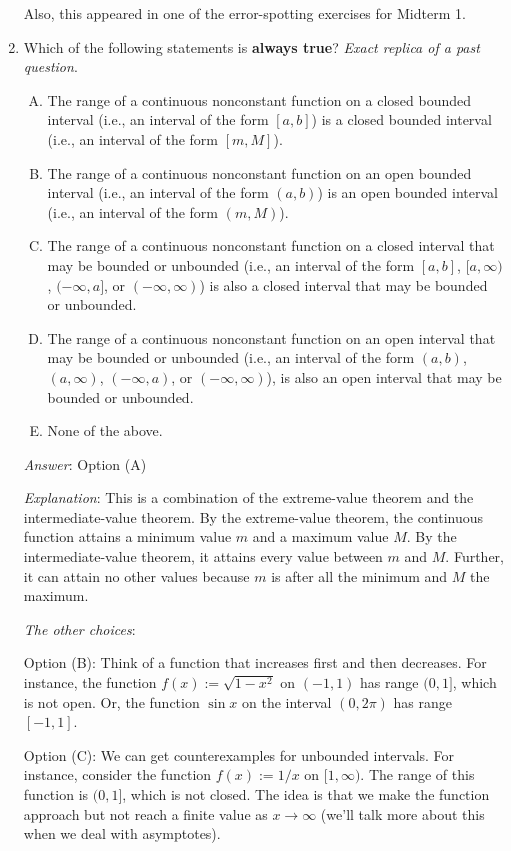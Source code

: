 \documentclass[10pt]{amsart}
\begin{document}
\begin{enumerate}
  Also, this appeared in one of the error-spotting exercises for
  Midterm 1.
\item Which of the following statements is {\bf always true}? {\em
  Exact replica of a past question}.

  \begin{enumerate}[(A)]

  \item The range of a continuous nonconstant function on a closed
    bounded interval (i.e., an interval of the form $[a,b]$) is a
    closed bounded interval (i.e., an interval of the form $[m,M]$).
  \item The range of a continuous nonconstant function on an open
    bounded interval (i.e., an interval of the form $(a,b)$) is an
    open bounded interval (i.e., an interval of the form $(m,M)$).
  \item The range of a continuous nonconstant function on a closed
    interval that may be bounded or unbounded (i.e., an interval of
    the form $[a,b]$, $[a,\infty)$, $(-\infty,a]$, or
    $(-\infty,\infty)$) is also a closed interval that may be bounded
    or unbounded.
  \item The range of a continuous nonconstant function on an open
    interval that may be bounded or unbounded (i.e., an interval of
    the form $(a,b)$,$(a,\infty)$, $(-\infty,a)$, or
    $(-\infty,\infty)$), is also an open interval that may be bounded
    or unbounded.
  \item None of the above.
  \end{enumerate}

  {\em Answer}: Option (A)

  {\em Explanation}: This is a combination of the extreme-value
  theorem and the intermediate-value theorem. By the extreme-value
  theorem, the continuous function attains a minimum value $m$ and a
  maximum value $M$. By the intermediate-value theorem, it attains
  every value between $m$ and $M$. Further, it can attain no other
  values because $m$ is after all the minimum and $M$ the maximum.

  {\em The other choices}:

  Option (B): Think of a function that increases first and then
  decreases. For instance, the function $f(x) := \sqrt{1 - x^2}$ on
  $(-1,1)$ has range $(0,1]$, which is not open. Or, the function
  $\sin x$ on the interval $(0,2\pi)$ has range $[-1,1]$.

  Option (C): We can get counterexamples for unbounded intervals. For
  instance, consider the function $f(x) := 1/x$ on $[1,\infty)$. The
  range of this function is $(0,1]$, which is not closed. The idea is
  that we make the function approach but not reach a finite value as
  $x \to \infty$ (we'll talk more about this when we deal with
  asymptotes).


\end{enumerate}
\end{document}
